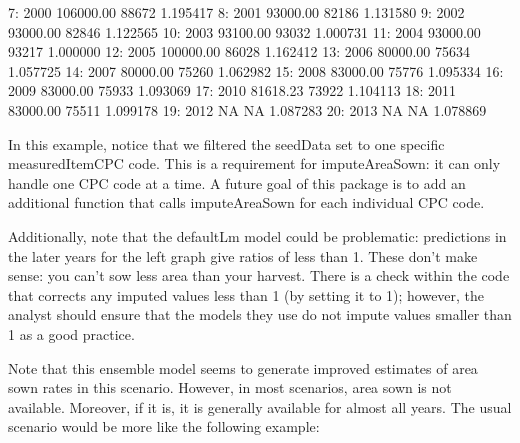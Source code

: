 \documentclass[nojss]{jss}
\begin{document}
\begin{Schunk}
\begin{Soutput}
 7: 2000 106000.00         88672            1.195417
 8: 2001  93000.00         82186            1.131580
 9: 2002  93000.00         82846            1.122565
10: 2003  93100.00         93032            1.000731
11: 2004  93000.00         93217            1.000000
12: 2005 100000.00         86028            1.162412
13: 2006  80000.00         75634            1.057725
14: 2007  80000.00         75260            1.062982
15: 2008  83000.00         75776            1.095334
16: 2009  83000.00         75933            1.093069
17: 2010  81618.23         73922            1.104113
18: 2011  83000.00         75511            1.099178
19: 2012        NA            NA            1.087283
20: 2013        NA            NA            1.078869
\end{Soutput}
\end{Schunk}

In this example, notice that we filtered the seedData set to one specific
measuredItemCPC code.  This is a requirement for imputeAreaSown: it can only
handle one CPC code at a time.  A future goal of this package is to add an
additional function that calls imputeAreaSown for each individual CPC code.

Additionally, note that the defaultLm model could be problematic: predictions
in the later years for the left graph give ratios of less than 1.  These don't
make sense: you can't sow less area than your harvest.  There is a check within
the code that corrects any imputed values less than 1 (by setting it to 1);
however, the analyst should ensure that the models they use do not impute
values smaller than 1 as a good practice.

Note that this ensemble model seems to generate improved estimates of area sown
rates in this scenario.  However, in most scenarios, area sown is not
available.  Moreover, if it is, it is generally available for almost all years.
The usual scenario would be more like the following example:
\end{document}
